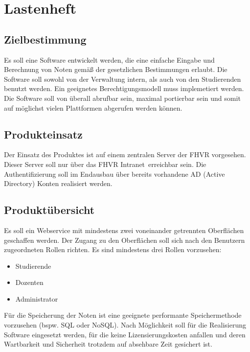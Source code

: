 \documentclass[12pt,a4paper,parskip]{scrreprt}
\begin{document}
\section{Lastenheft}
\subsection{Zielbestimmung}
Es soll eine Software entwickelt werden, die eine einfache Eingabe und Berechnung von Noten gemäß der gesetzlichen Bestimmungen erlaubt. Die Software soll sowohl von der Verwaltung intern, als auch von den Studierenden benutzt werden. Ein geeignetes Berechtigungsmodell muss implemetiert werden. Die Software soll von überall abrufbar sein, maximal portierbar sein und somit auf möglichst vielen Plattformen abgerufen werden können.
\subsection{Produkteinsatz}
Der Einsatz des Produktes ist auf einem zentralen Server der FHVR vorgesehen. Dieser Server soll nur über das \glqq FHVR Intranet\grqq\ erreichbar sein. Die Authentifizierung soll im Endausbau über bereits vorhandene AD (Active Directory) Konten realisiert werden.
\subsection{Produktübersicht}
Es soll ein Webservice mit mindestens zwei voneinander getrennten Oberflächen geschaffen werden. Der Zugang zu den Oberflächen soll sich nach den Benutzern zugeordneten Rollen richten. Es sind mindestens drei Rollen vorzusehen:
\begin{itemize}
\item Studierende
\item Dozenten
\item Administrator
\end{itemize}
Für die Speicherung der Noten ist eine geeignete performante Speichermethode vorzusehen (bspw. SQL oder NoSQL).
Nach Möglichkeit soll für die Realisierung Software eingesetzt werden, für die keine Lizensierungskosten anfallen und deren Wartbarkeit und Sicherheit trotzdem auf absehbare Zeit gesichert ist.
\end{document}
